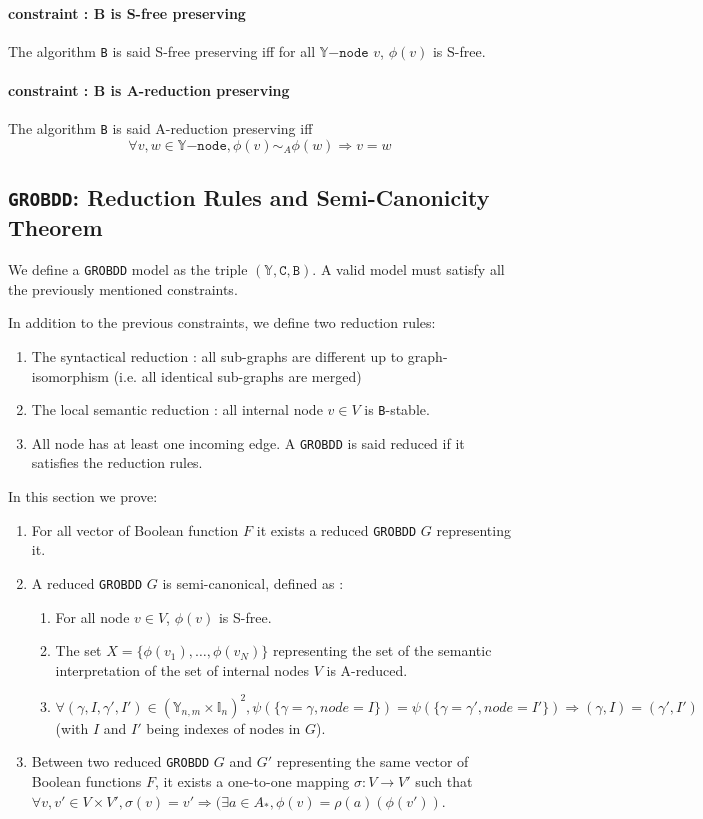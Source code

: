 \documentclass[a4paper,10pt]{article}
\newcommand{\Y}{\mathbb{Y}}
\newcommand{\I}{\mathbb{I}}
\newcommand{\Ynode}{\Y\mathtt{-node}}
\newcommand{\GroBdd}{\texttt{GROBDD}}
\begin{document}
\paragraph{constraint : B is S-free preserving\\}
The algorithm \texttt{B} is said S-free preserving iff for all $\Ynode$ $v$, $\phi(v)$ is S-free.

\paragraph{constraint : B is A-reduction preserving\\}
The algorithm \texttt{B} is said A-reduction preserving iff
\[\forall v, w \in\Ynode, \phi(v) \sim_A \phi(w) \Rightarrow v = w\]

\subsection{\GroBdd{}: Reduction Rules and Semi-Canonicity Theorem\label{grobdd-reduction}}
We define a \GroBdd{} model as the triple $(\Y, \mathtt{C}, \mathtt{B})$.
A valid model must satisfy all the previously mentioned constraints.

In addition to the previous constraints, we define two reduction rules:\begin{enumerate}
\item The syntactical reduction : all sub-graphs are different up to graph-isomorphism (i.e. all identical sub-graphs are merged)
\item The local semantic reduction : all internal node $v\in V$ is \texttt{B}-stable.
\item All node has at least one incoming edge.
A \GroBdd{} is said reduced if it satisfies the reduction rules.
\end{enumerate}
In this section we prove:\begin{enumerate}
\item For all vector of Boolean function $F$ it exists a reduced \GroBdd{} $G$ representing it.
\item A reduced \GroBdd{} $G$ is semi-canonical, defined as :\begin{enumerate}
\item For all node $v\in V$, $\phi(v)$ is S-free.
\item The set $X = \{\phi(v_1), \dots, \phi(v_N)\}$ representing the set of the semantic interpretation of the set of internal nodes $V$ is A-reduced.
\item $\forall (\gamma, I, \gamma', I') \in (\Y_{n, m} \times \I_n)^2, \psi(\{\gamma = \gamma, node = I\}) = \psi(\{\gamma = \gamma', node = I'\}) \Rightarrow (\gamma, I) = (\gamma', I')$ (with $I$ and $I'$ being indexes of nodes in $G$).
\end{enumerate}
\item Between two reduced \GroBdd{} $G$ and $G'$ representing the same vector of Boolean functions $F$, it exists a one-to-one mapping $\sigma : V \longrightarrow V'$ such that $\forall v, v' \in V \times V', \sigma(v) = v' \Rightarrow (\exists a \in A_{*}, \phi(v) = \rho(a)(\phi(v'))$.
\end{enumerate}
\end{document}
